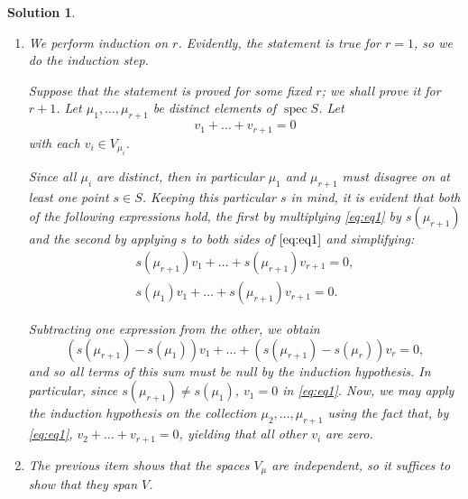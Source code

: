 \documentclass{article}
\theoremstyle{nonumberplain}
\newtheorem{sol}{Solution}
\DeclareMathOperator{\spec}{spec}
\begin{document}
\begin{sol}
\begin{enumerate}
\begin{itemize}
\item $\mu(e) = \frac vv = 1$,
\item $\mu(s_1 + s_2) = \frac{(s_1 + s_2)(v)}v = \frac{s_1(v)}v + \frac{s_2(v)}v = \mu(s_1) + \mu(s_2)$,
\item $\mu(\lambda s_1) = \frac{\lambda s_1(v)}v = \lambda \frac{s_1(v)}v = \lambda \mu(s_1)$,
\item $\mu(s_1 s_2) = \frac{s_1(s_2(v))}v = \frac{s_1\left(\frac{s_2(v)}v v\right)}v = \frac{s_1(\mu(s_2) v)}v = \mu(s_2) \frac{s_2(v)}v = \mu(s_1) \mu(s_2)$.
\end{itemize}

\item We perform induction on $r$. Evidently, the statement is true for $r = 1$, so we do the induction step.

Suppose that the statement is proved for some fixed $r$; we shall prove it for $r+1$. Let $\mu_1, \dots, \mu_{r+1}$ be distinct elements of $\spec S$. Let
\begin{equation}\label{eq:eq1}
v_1 + \dots + v_{r+1} = 0
\end{equation}
with each $v_i \in V_{\mu_i}$.

Since all $\mu_i$ are distinct, then in particular $\mu_1$ and $\mu_{r+1}$ must disagree on at least one point $s \in S$. Keeping this particular $s$ in mind, it is evident that both of the following expressions hold, the first by multiplying \eqref{eq:eq1} by $s(\mu_{r+1})$ and the second by applying $s$ to both sides of $\eqref{eq:eq1}$ and simplifying:
\begin{gather}
s(\mu_{r+1}) v_1 + \dots + s(\mu_{r+1}) v_{r+1} = 0,\\
s(\mu_1) v_1 + \dots + s(\mu_{r+1}) v_{r+1} = 0.
\end{gather}

Subtracting one expression from the other, we obtain
\begin{equation}
(s(\mu_{r+1})-s(\mu_1)) v_1 + \dots + (s(\mu_{r+1})-s(\mu_{r})) v_{r} = 0,
\end{equation}
and so all terms of this sum must be null by the induction hypothesis. In particular, since $s(\mu_{r+1}) \neq s(\mu_1)$, $v_1 = 0$ in \eqref{eq:eq1}. Now, we may apply the induction hypothesis on the collection $\mu_2, \dots, \mu_{r+1}$ using the fact that, by \eqref{eq:eq1}, $v_2 + \dots + v_{r+1} = 0$, yielding that all other $v_i$ are zero.

\item The previous item shows that the spaces $V_\mu$ are independent, so it suffices to show that they span $V$.


\end{enumerate}
\end{sol}
\end{document}
